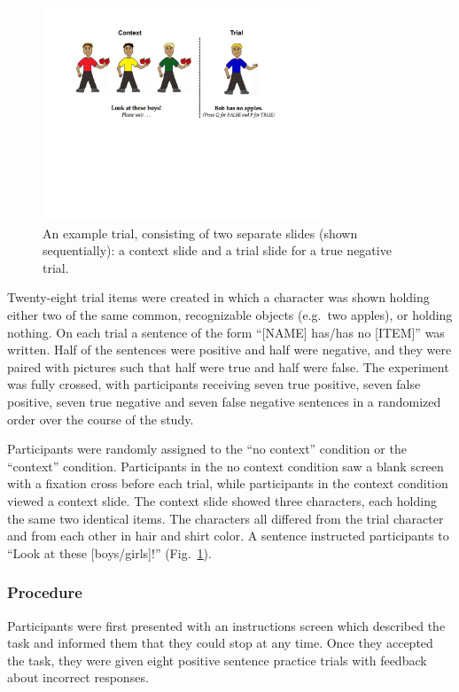 \documentclass[10pt,letterpaper]{article}
\begin{document}
\begin{figure}[t]
\begin{center} 
\includegraphics[width=3.25in]{figures/negatron_trialfig2.pdf}
\caption{\label{fig:trial} An example trial, consisting of two separate slides (shown sequentially): a context slide and a trial slide for a true negative trial. }
\vspace{-5mm}
\end{center} 
\end{figure}

Twenty-eight trial items were created in which a character was shown holding either two of the same common, recognizable objects (e.g.\ two apples), or holding nothing.  On each trial a sentence of the form ``[NAME] has/has no [ITEM]'' was written.  Half of the sentences were positive and half were negative, and they were paired with pictures such that half were true and half were false.  The experiment was fully crossed, with participants receiving seven true positive, seven false positive, seven true negative and seven false negative sentences in a randomized order over the course of the study.  

Participants were randomly assigned to the ``no context'' condition or the ``context'' condition.  Participants in the no context condition saw a blank screen with a fixation cross before each trial, while participants in the context condition viewed a context slide.  The context slide showed three characters, each holding the same two identical items.  The characters all differed from the trial character and from each other in hair and shirt color.  A sentence instructed participants to ``Look at these [boys/girls]!'' (Fig.\ \ref{fig:trial}).  


\subsubsection{Procedure}
Participants were first presented with an instructions screen which described the task and informed them that they could stop at any time.  Once they accepted the task, they were given eight positive sentence practice trials with feedback about incorrect responses. 
\end{document}
